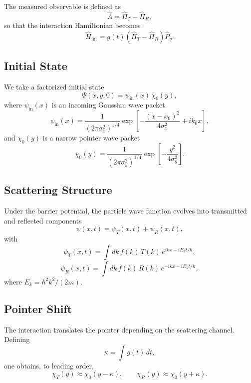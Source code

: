 {The measured observable is defined as
\begin{equation}
\hat A = \hat \Pi_T - \hat \Pi_R,
\end{equation}
so that the interaction Hamiltonian becomes
\begin{equation}
\hat H_{\text{int}} = g(t)(\hat \Pi_T - \hat \Pi_R)\hat P_y.
\end{equation}

\subsection{Initial State}

We take a factorized initial state
\begin{equation}
\Psi(x,y,0) = \psi_{\text{in}}(x)\,\chi_0(y),
\end{equation}
where $\psi_{\text{in}}(x)$ is an incoming Gaussian wave packet
\begin{equation}
\psi_{\text{in}}(x) =
\frac{1}{(2\pi \sigma_x^2)^{1/4}}
\exp\left[-\frac{(x-x_0)^2}{4\sigma_x^2} + i k_0 x\right],
\end{equation}
and $\chi_0(y)$ is a narrow pointer wave packet
\begin{equation}
\chi_0(y) =
\frac{1}{(2\pi \sigma_y^2)^{1/4}}
\exp\left[-\frac{y^2}{4\sigma_y^2}\right].
\end{equation}

\subsection{Scattering Structure}

Under the barrier potential, the particle wave function evolves into transmitted and reflected components
\begin{equation}
\psi(x,t) = \psi_T(x,t) + \psi_R(x,t),
\end{equation}
with
\begin{equation}
\psi_T(x,t) = \int dk\, f(k)\,T(k)\,e^{ikx - iE_k t/\hbar},
\end{equation}
\begin{equation}
\psi_R(x,t) = \int dk\, f(k)\,R(k)\,e^{-ikx - iE_k t/\hbar},
\end{equation}
where $E_k = \hbar^2 k^2 / (2m)$.

\subsection{Pointer Shift}

The interaction translates the pointer depending on the scattering channel. Defining
\begin{equation}
\kappa = \int g(t)\,dt,
\end{equation}
one obtains, to leading order,
\begin{equation}
\chi_T(y) \approx \chi_0(y - \kappa), \qquad
\chi_R(y) \approx \chi_0(y + \kappa).
\end{equation}

}
